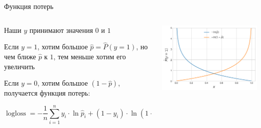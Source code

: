 \documentclass[notes,12pt, aspectratio=169]{beamer}
\newenvironment{wideitemize}{\itemize\addtolength{\itemsep}{10pt}}{\enditemize}
\DeclareMathOperator{\logloss}{logloss}
\begin{document}
\begin{frame}{Функция потерь}
	\begin{columns}[T] %
	\begin{column}{.5\textwidth}
		\begin{wideitemize}
			\item Наши $y$ принимают значения $0$ и $1$ 
			\item Если $y = 1$, хотим большое $\hat p = \hat P(y = 1)$, но чем ближе $\hat p$ к $1$, тем меньше хотим его увеличить 
			\item Если $y = 0$, хотим большое $(1 - \hat p)$, получается функция потерь: 
			
			$$
			\logloss = - \frac{1}{n} \sum_{i=1}^n y_i \cdot \ln \hat p_i + (1 - y_i) \cdot \ln (1 - \hat p_i)
			$$
		\end{wideitemize}	
	\end{column}%
	\hfill%
	\begin{column}{.5\textwidth}
		\begin{center}
			\includegraphics[width= 0.95\linewidth]{log_loss_05.png}
		\end{center}
	\end{column}%
\end{columns}
\end{frame}
\end{document}
